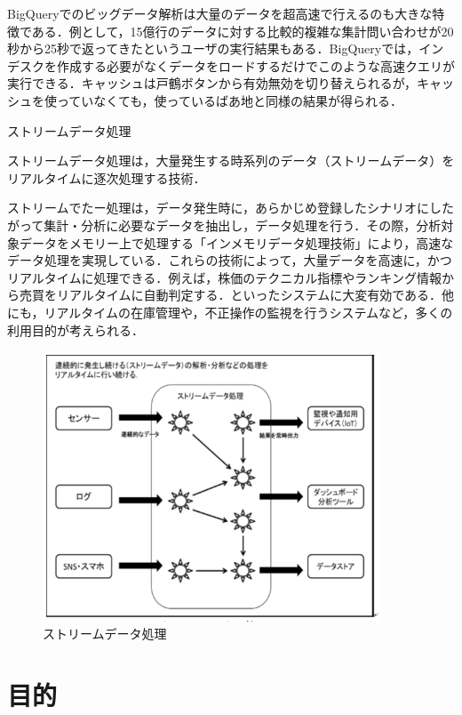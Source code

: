 BigQueryでのビッグデータ解析は大量のデータを超高速で行えるのも大きな特徴である．例として，15億行のデータに対する比較的複雑な集計問い合わせが20秒から25秒で返ってきたというユーザの実行結果もある．BigQueryでは，インデスクを作成する必要がなくデータをロードするだけでこのような高速クエリが実行できる．キャッシュは戸鶴ボタンから有効無効を切り替えられるが，キャッシュを使っていなくても，使っているばあ地と同様の結果が得られる．



ストリームデータ処理

ストリームデータ処理は，大量発生する時系列のデータ（ストリームデータ）をリアルタイムに逐次処理する技術．

ストリームでたー処理は，データ発生時に，あらかじめ登録したシナリオにしたがって集計・分析に必要なデータを抽出し，データ処理を行う．その際，分析対象データをメモリー上で処理する「インメモリデータ処理技術」により，高速なデータ処理を実現している．これらの技術によって，大量データを高速に，かつリアルタイムに処理できる．例えば，株価のテクニカル指標やランキング情報から売買をリアルタイムに自動判定する．といったシステムに大変有効である．他にも，リアルタイムの在庫管理や，不正操作の監視を行うシステムなど，多くの利用目的が考えられる．

\begin{figure}[H]
\centering
\includegraphics[width=10cm]{streamdatasyori.png}
\caption{ストリームデータ処理}\label{サンプル図}
\end{figure}





\chapter{目的}

